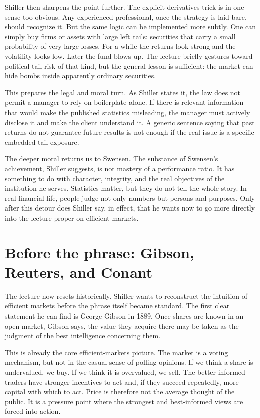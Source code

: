 Shiller then sharpens the point further. The explicit derivatives trick is in one sense too obvious. Any experienced professional, once the strategy is laid bare, should recognize it. But the same logic can be implemented more subtly. One can simply buy firms or assets with large left tails: securities that carry a small probability of very large losses. For a while the returns look strong and the volatility looks low. Later the fund blows up. The lecture briefly gestures toward political tail risk of that kind, but the general lesson is sufficient: the market can hide bombs inside apparently ordinary securities.

This prepares the legal and moral turn. As Shiller states it, the law does not permit a manager to rely on boilerplate alone. If there is relevant information that would make the published statistics misleading, the manager must actively disclose it and make the client understand it. A generic sentence saying that past returns do not guarantee future results is not enough if the real issue is a specific embedded tail exposure.

The deeper moral returns us to Swensen. The substance of Swensen's achievement, Shiller suggests, is not mastery of a performance ratio. It has something to do with character, integrity, and the real objectives of the institution he serves. Statistics matter, but they do not tell the whole story. In real financial life, people judge not only numbers but persons and purposes. Only after this detour does Shiller say, in effect, that he wants now to go more directly into the lecture proper on efficient markets.

\section{Before the phrase: Gibson, Reuters, and Conant}

The lecture now resets historically. Shiller wants to reconstruct the intuition of efficient markets before the phrase itself became standard. The first clear statement he can find is George Gibson in 1889. Once shares are known in an open market, Gibson says, the value they acquire there may be taken as the judgment of the best intelligence concerning them.

This is already the core efficient-markets picture. The market is a voting mechanism, but not in the casual sense of polling opinions. If we think a share is undervalued, we buy. If we think it is overvalued, we sell. The better informed traders have stronger incentives to act and, if they succeed repeatedly, more capital with which to act. Price is therefore not the average thought of the public. It is a pressure point where the strongest and best-informed views are forced into action.

